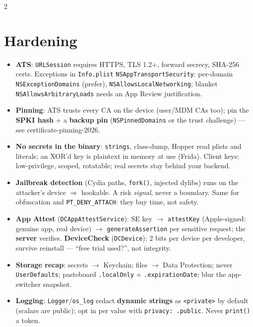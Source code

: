 \documentclass[8pt]{extarticle}
\begin{document}


\begin{multicols}{2}
\raggedright

\section{Hardening}
\begin{itemize}
  \item \textbf{ATS}: \texttt{URLSession} requires HTTPS, TLS 1.2+, forward
        secrecy, SHA-256 certs. Exceptions in \texttt{Info.plist}
        \texttt{NSAppTransportSecurity}: per-domain
        \texttt{NSExceptionDomains} (prefer), \texttt{NSAllowsLocalNetworking};
        blanket \texttt{NSAllowsArbitraryLoads} needs an App Review
        justification.
  \item \textbf{Pinning}: ATS trusts every CA on the device (user/MDM CAs
        too); pin the \textbf{SPKI hash} + a \textbf{backup pin}
        (\texttt{NSPinnedDomains} or the trust challenge) — see
        certificate-pinning-2026.
  \item \textbf{No secrets in the binary}: \texttt{strings}, class-dump,
        Hopper read plists and literals; an XOR'd key is plaintext in memory
        at use (Frida). Client keys: low-privilege, scoped, rotatable; real
        secrets stay behind your backend.
  \item \textbf{Jailbreak detection} (Cydia paths, \texttt{fork()},
        injected dylibs) runs on the attacker's device $\Rightarrow$ hookable.
        A risk \emph{signal}, never a boundary. Same for obfuscation and
        \texttt{PT\_DENY\_ATTACH}: they buy time, not safety.
  \item \textbf{App Attest} (\texttt{DCAppAttestService}): SE key
        $\to$ \texttt{attestKey} (Apple-signed: genuine app, real device)
        $\to$ \texttt{generateAssertion} per sensitive request; the
        \textbf{server} verifies. \textbf{DeviceCheck}
        (\texttt{DCDevice}): 2 bits per device per developer, survive
        reinstall — ``free trial used?'', not integrity.
  \item \textbf{Storage recap}: secrets $\to$ Keychain; files $\to$ Data
        Protection; never \texttt{UserDefaults}; pasteboard
        \texttt{.localOnly} + \texttt{.expirationDate}; blur the app-switcher
        snapshot.
  \item \textbf{Logging}: \texttt{Logger}/\texttt{os\_log} redact
        \textbf{dynamic strings} as \texttt{<private>} by default (scalars are
        public)\unverified; opt in per value with \texttt{privacy: .public}. Never
        \texttt{print()} a token.
\end{itemize}


\end{multicols}
\end{document}
